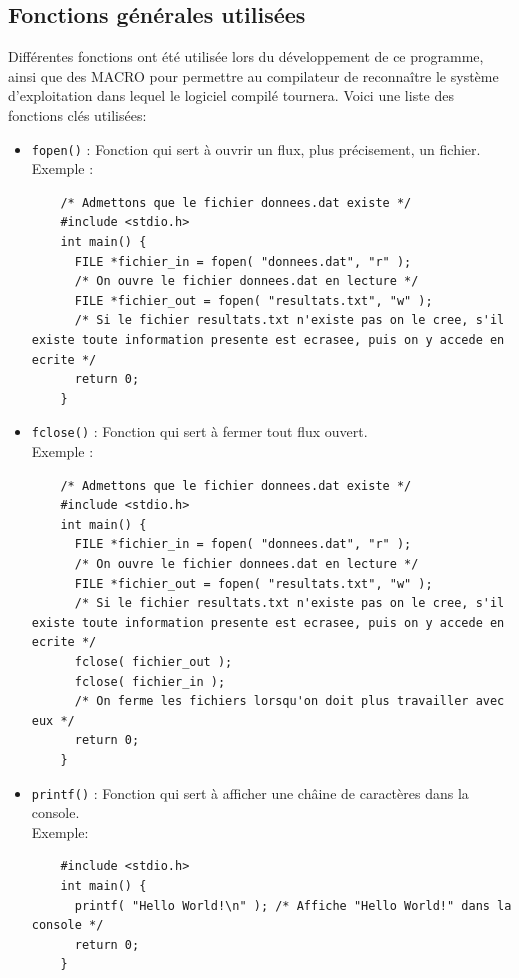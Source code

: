\documentclass[11pt]{article}
\begin{document}
\subsection{Fonctions générales utilisées}
Différentes fonctions ont été utilisée lors du développement de ce programme, ainsi que des MACRO pour
permettre au compilateur de reconnaître le système d'exploitation dans lequel le logiciel compilé tournera.
Voici une liste des fonctions clés utilisées:
\begin{itemize}
  
\item \texttt{fopen()} : Fonction qui sert à ouvrir un flux, plus précisement, un fichier.\\
  Exemple :
  \begin{lstlisting}
    /* Admettons que le fichier donnees.dat existe */
    #include <stdio.h>
    int main() {
      FILE *fichier_in = fopen( "donnees.dat", "r" );
      /* On ouvre le fichier donnees.dat en lecture */
      FILE *fichier_out = fopen( "resultats.txt", "w" );
      /* Si le fichier resultats.txt n'existe pas on le cree, s'il existe toute information presente est ecrasee, puis on y accede en ecrite */
      return 0;
    }
  \end{lstlisting}

\item \texttt{fclose()} : Fonction qui sert à fermer tout flux ouvert.\\
  Exemple :
  \begin{lstlisting}
    /* Admettons que le fichier donnees.dat existe */
    #include <stdio.h>
    int main() {
      FILE *fichier_in = fopen( "donnees.dat", "r" );
      /* On ouvre le fichier donnees.dat en lecture */
      FILE *fichier_out = fopen( "resultats.txt", "w" );
      /* Si le fichier resultats.txt n'existe pas on le cree, s'il existe toute information presente est ecrasee, puis on y accede en ecrite */
      fclose( fichier_out );
      fclose( fichier_in );
      /* On ferme les fichiers lorsqu'on doit plus travailler avec eux */
      return 0;
    }
  \end{lstlisting}

  
\item \texttt{printf()} : Fonction qui sert à afficher une châine de caractères dans la console.\\
  Exemple:
  \begin{lstlisting}
    #include <stdio.h>
    int main() {
      printf( "Hello World!\n" ); /* Affiche "Hello World!" dans la console */
      return 0;
    }
  \end{lstlisting}
  

\end{itemize}
\end{document}
